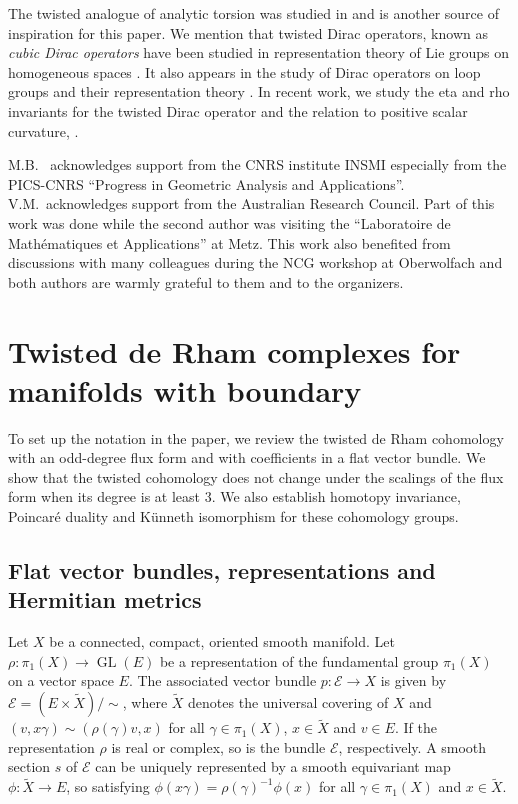 \documentclass[12pt]{amsart}
\theoremstyle{plain}
\theoremstyle{definition}
\theoremstyle{remark}
\begin{document}
The twisted analogue of analytic torsion was studied in \cite{MW, MW2} and 
is another source of inspiration for this paper. We mention that twisted Dirac operators,
known as {\em cubic Dirac operators} have been studied in representation theory
of Lie groups on homogeneous spaces \cite{Kostant, Slebarski}. It  also appears in the study of Dirac operators on 
loop groups and their representation theory \cite{Landweber}.   In recent work, we study the {{eta}} and rho invariants for the twisted Dirac operator and the relation to positive scalar curvature, \cite{BM, BM2}.
 

\medskip

M.B. ~acknowledges support from the CNRS institute INSMI especially from the PICS-CNRS ``Progress in Geometric Analysis and Applications''.
V.M.~acknowledges support from the Australian Research Council.
Part of this work was done while the second author was visiting the ``Laboratoire de Math\'ematiques et Applications'' at Metz. This work also benefited from discussions with many colleagues during the NCG workshop at Oberwolfach and both authors are warmly grateful to them and to the organizers.

\section{Twisted de Rham complexes for manifolds with boundary}
To set up the notation in the paper, we review the twisted de Rham
cohomology \cite{RW,BCMMS} with an odd-degree flux form and with
coefficients in a flat vector bundle.
We show that the twisted cohomology does not change under the scalings of
the flux form when its degree is at least $3$.
We also establish homotopy invariance, Poincar\'e duality and K\"unneth
isomorphism for these cohomology groups.

\subsection{Flat vector bundles, representations and Hermitian metrics}
\label{sect:scalar}
Let $X$ be a connected, compact, oriented smooth manifold.
Let $\rho\colon\pi_1(X)\to{\operatorname{GL}}(E)$ be a representation of the fundamental
group $\pi_1(X)$ on a vector space $E$.
The associated vector bundle $p\colon{\mathcal E}\to X$ is given by
${\mathcal E}=(E\times\widetilde X)/\sim$, where $\widetilde X$ denotes the universal
covering of $X$ and $(v,x\gamma)\sim(\rho(\gamma)v,x)$ for all
$\gamma\in\pi_1(X)$, $x\in\widetilde X$ and $v\in E$.
If the representation $\rho$ is real or complex, so is the bundle ${\mathcal E}$,
respectively.
A smooth section $s$ of ${\mathcal E}$ can be uniquely represented by a smooth 
equivariant map $\phi\colon\widetilde X\to E$, {{so}} satisfying
$\phi(x\gamma)=\rho(\gamma)^{-1}\phi(x)$ for all $\gamma\in\pi_1(X)$
and $x\in\widetilde X$. 
\end{document}

